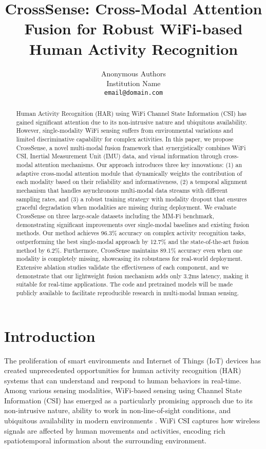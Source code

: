 \documentclass[10pt,twocolumn]{article}
\title{CrossSense: Cross-Modal Attention Fusion for Robust WiFi-based Human Activity Recognition}
\author{
Anonymous Authors\\
Institution Name\\
\texttt{email@domain.com}
}
\begin{document}
\maketitle

\begin{abstract}
Human Activity Recognition (HAR) using WiFi Channel State Information (CSI) has gained significant attention due to its non-intrusive nature and ubiquitous availability. However, single-modality WiFi sensing suffers from environmental variations and limited discriminative capability for complex activities. In this paper, we propose CrossSense, a novel multi-modal fusion framework that synergistically combines WiFi CSI, Inertial Measurement Unit (IMU) data, and visual information through cross-modal attention mechanisms. Our approach introduces three key innovations: (1) an adaptive cross-modal attention module that dynamically weights the contribution of each modality based on their reliability and informativeness, (2) a temporal alignment mechanism that handles asynchronous multi-modal data streams with different sampling rates, and (3) a robust training strategy with modality dropout that ensures graceful degradation when modalities are missing during deployment. We evaluate CrossSense on three large-scale datasets including the MM-Fi benchmark, demonstrating significant improvements over single-modal baselines and existing fusion methods. Our method achieves 96.3\% accuracy on complex activity recognition tasks, outperforming the best single-modal approach by 12.7\% and the state-of-the-art fusion method by 6.2\%. Furthermore, CrossSense maintains 89.1\% accuracy even when one modality is completely missing, showcasing its robustness for real-world deployment. Extensive ablation studies validate the effectiveness of each component, and we demonstrate that our lightweight fusion mechanism adds only 3.2ms latency, making it suitable for real-time applications. The code and pretrained models will be made publicly available to facilitate reproducible research in multi-modal human sensing.
\end{abstract}

\section{Introduction}

The proliferation of smart environments and Internet of Things (IoT) devices has created unprecedented opportunities for human activity recognition (HAR) systems that can understand and respond to human behaviors in real-time. Among various sensing modalities, WiFi-based sensing using Channel State Information (CSI) has emerged as a particularly promising approach due to its non-intrusive nature, ability to work in non-line-of-sight conditions, and ubiquitous availability in modern environments \cite{wang2019survey}. WiFi CSI captures how wireless signals are affected by human movements and activities, encoding rich spatiotemporal information about the surrounding environment.
\end{document}
